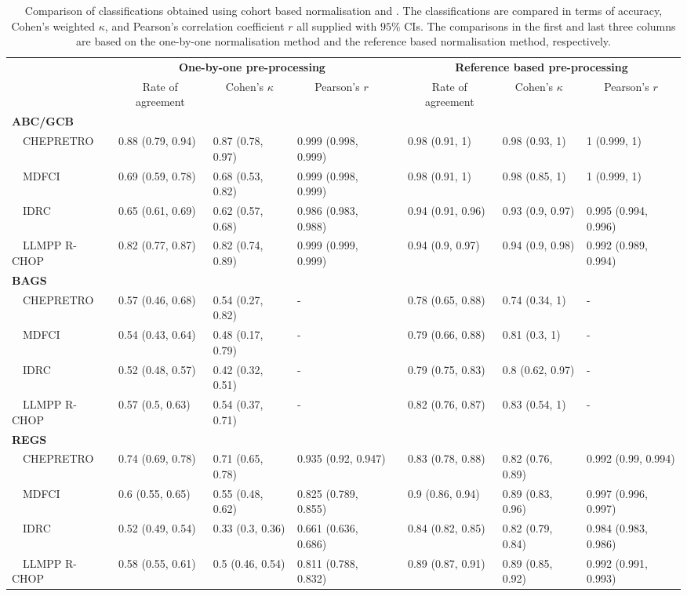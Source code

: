 \begin{table}[!tbp]
{\scriptsize
\caption{Comparison of classifications obtained using cohort based
normalisation and \hemaClass{}.
The classifications are compared in terms of accuracy, Cohen's weighted
$\kappa$, and Pearson's correlation coefficient $r$ all supplied with $95\%$
CIs. The comparisons in the first and last three columns are based on the
one-by-one normalisation method and the reference based normalisation method,
respectively.\label{tab:classALL}} 
\begin{center}
\begin{tabular}{llllclll}
\hline\hline
\multicolumn{1}{l}{\bfseries }&\multicolumn{3}{c}{\bfseries One-by-one pre-processing}&\multicolumn{1}{c}{\bfseries }&\multicolumn{3}{c}{\bfseries Reference based pre-processing}\tabularnewline
\cline{2-4} \cline{6-8}
\multicolumn{1}{l}{}&\multicolumn{1}{c}{Rate of agreement}&\multicolumn{1}{c}{Cohen's $\kappa$}&\multicolumn{1}{c}{Pearson's $r$}&\multicolumn{1}{c}{}&\multicolumn{1}{c}{Rate of agreement}&\multicolumn{1}{c}{Cohen's $\kappa$}&\multicolumn{1}{c}{Pearson's $r$}\tabularnewline
\hline
{\bfseries ABC/GCB}&&&&&&&\tabularnewline
~~CHEPRETRO&0.88 (0.79, 0.94)&0.87 (0.78, 0.97)&0.999 (0.998, 0.999)&&0.98 (0.91, 1)&0.98 (0.93, 1)&1 (0.999, 1)\tabularnewline
~~MDFCI&0.69 (0.59, 0.78)&0.68 (0.53, 0.82)&0.999 (0.998, 0.999)&&0.98 (0.91, 1)&0.98 (0.85, 1)&1 (0.999, 1)\tabularnewline
~~IDRC&0.65 (0.61, 0.69)&0.62 (0.57, 0.68)&0.986 (0.983, 0.988)&&0.94 (0.91, 0.96)&0.93 (0.9, 0.97)&0.995 (0.994, 0.996)\tabularnewline
~~LLMPP R-CHOP&0.82 (0.77, 0.87)&0.82 (0.74, 0.89)&0.999 (0.999, 0.999)&&0.94 (0.9, 0.97)&0.94 (0.9, 0.98)&0.992 (0.989, 0.994)\tabularnewline
\hline
{\bfseries BAGS}&&&&&&&\tabularnewline
~~CHEPRETRO&0.57 (0.46, 0.68)&0.54 (0.27, 0.82)&-&&0.78 (0.65, 0.88)&0.74 (0.34, 1)&-\tabularnewline
~~MDFCI&0.54 (0.43, 0.64)&0.48 (0.17, 0.79)&-&&0.79 (0.66, 0.88)&0.81 (0.3, 1)&-\tabularnewline
~~IDRC&0.52 (0.48, 0.57)&0.42 (0.32, 0.51)&-&&0.79 (0.75, 0.83)&0.8 (0.62, 0.97)&-\tabularnewline
~~LLMPP R-CHOP&0.57 (0.5, 0.63)&0.54 (0.37, 0.71)&-&&0.82 (0.76, 0.87)&0.83 (0.54, 1)&-\tabularnewline
\hline
{\bfseries REGS}&&&&&&&\tabularnewline
~~CHEPRETRO&0.74 (0.69, 0.78)&0.71 (0.65, 0.78)&0.935 (0.92, 0.947)&&0.83 (0.78, 0.88)&0.82 (0.76, 0.89)&0.992 (0.99, 0.994)\tabularnewline
~~MDFCI&0.6 (0.55, 0.65)&0.55 (0.48, 0.62)&0.825 (0.789, 0.855)&&0.9 (0.86, 0.94)&0.89 (0.83, 0.96)&0.997 (0.996, 0.997)\tabularnewline
~~IDRC&0.52 (0.49, 0.54)&0.33 (0.3, 0.36)&0.661 (0.636, 0.686)&&0.84 (0.82, 0.85)&0.82 (0.79, 0.84)&0.984 (0.983, 0.986)\tabularnewline
~~LLMPP R-CHOP&0.58 (0.55, 0.61)&0.5 (0.46, 0.54)&0.811 (0.788, 0.832)&&0.89 (0.87, 0.91)&0.89 (0.85, 0.92)&0.992 (0.991, 0.993)\tabularnewline
\hline
\end{tabular}\end{center}}

\end{table}
